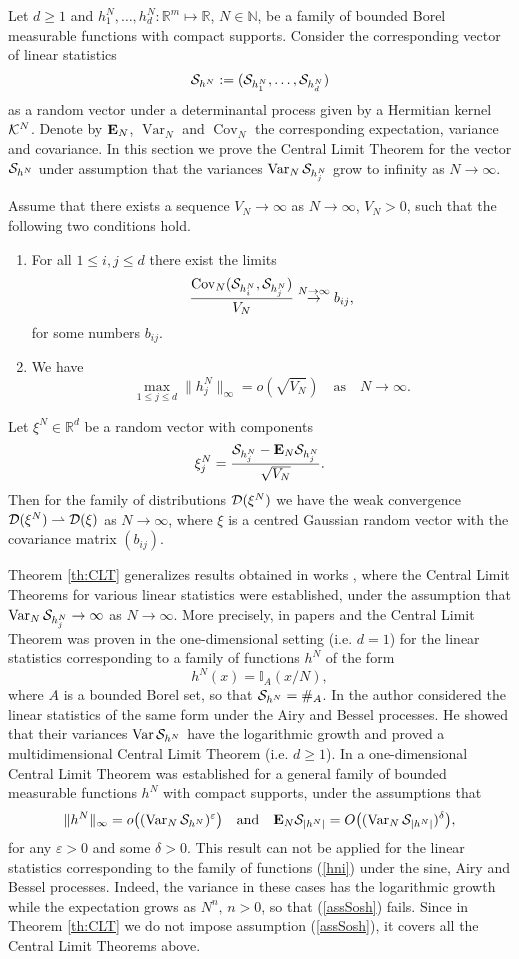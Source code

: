 \documentclass{article}
\numberwithin{equation}{section}
\newcommand{\mR}{\mathbb{R}}
\newcommand{\mN}{\mathbb{N}}
\newcommand{\mI}{\mathbb{I}}
\newcommand{\DD}{{\cal D}}
\newcommand{\SSS}{{\cal S}}
\newcommand{\KK}{{\cal K}}
\newcommand{\eps}{\varepsilon}
\newcommand{\Cov}{\operatorname{Cov}}
\newcommand{\Var}{\operatorname{Var}}
\newcommand{\MON}{\mbox{\bf E}_N}
\newcommand{\ra}{\rightarrow}
\newcommand{\raw}{\rightharpoonup}
\newcommand{\os}{\overset}
\newcommand{\fr}{\frac}
\newcommand{\qmb}{\quad\mbox}
\newcommand{\qu}{\quad}
\newcommand{\lbl}{\label}
\newcommand{\ass}{\quad\mbox{as}\quad}
\newcommand{\bee}{\begin{equation}}
\newcommand{\eee}{\end{equation}}
\newcommand{\btt}{\begin{theo}}
\newcommand{\ett}{\end{theo}}
\begin{document}
Let $d\geq 1$ and $h_1^N,\ldots, h^N_d:\mR^m\mapsto\mR$, $N\in\mN$,
be a family of bounded Borel measurable functions with compact supports.
Consider the corresponding vector of linear statistics
$$
\SSS_{h^N}:=(\SSS_{h^N_1},\ldots,\SSS_{h^N_d})
$$
as a random vector under a determinantal process given by a Hermitian kernel $\KK^N$.
Denote by $\MON$, $\Var_N$ and $\Cov_N$ the corresponding expectation, variance and covariance.
In this section we prove the Central Limit Theorem
for the vector $\SSS_{h^N}$
under assumption that the variances $\Var_N\SSS_{h^N_j}$ grow to infinity as $N\ra\infty$.
\btt\label{th:CLT}
Assume that there exists a sequence $V_N\ra\infty$ as $N\ra\infty$, $V_N >0$,
such that the following
two conditions hold.
\begin{enumerate}
  \item For all $1\leq i,j\leq d$ there exist the limits
\bee\lbl{thcov}
\fr{\Cov_N (\SSS_{h^N_i},\SSS_{h^N_j})}{V_N}\os{N\ra\infty}\ra b_{ij} ,
\eee
for some numbers $b_{ij}$.
\item We have
\bee
\lbl{th|h|}
\max\limits_{1\leq j\leq d} \|h^N_j\|_\infty = o(\sqrt{V_N}) \ass N\ra\infty.
\eee
\end{enumerate}
Let $\xi^N\in\mR^d$ be a random vector with components
\bee\lbl{gxi}
\xi^N_j=\fr{\SSS_{h^N_j}-\MON\SSS_{h^N_j}}{\sqrt{V_N}}.
\eee
Then for the family of distributions $\DD(\xi^N)$ we have the weak convergence $\DD(\xi^N)\raw \DD(\xi)$ as $N\ra\infty$, where $\xi$ is a
centred Gaussian random vector with the covariance matrix $(b_{ij}).$
\ett
Theorem \ref{th:CLT}  generalizes results obtained in works \cite{CL,So00,SoAB,So01},
where the Central Limit Theorems for various linear statistics were established,
under the assumption that $\Var_N\SSS_{h^N_j}\ra\infty$ as $N\ra\infty$.
More precisely, in papers \cite{CL} and \cite{So00}
the Central Limit Theorem was proven in the one-dimensional setting (i.e. $d=1$)
for the linear statistics
corresponding to a family of functions $h^N$ of the form
\bee\lbl{hni}
h^N(x)=\mI_{A}(x/N),
\eee
where $A$ is a bounded Borel set, so that $\SSS_{h^N}=\#_A$.
In \cite{SoAB} the author considered the linear statistics of the same form
under the Airy and Bessel processes.
He showed that their variances $\Var\SSS_{h^N}$
have the logarithmic growth
and proved a multidimensional Central Limit Theorem (i.e. $d\geq 1$).
In \cite{So01} a one-dimensional Central Limit Theorem was established
for a general family of
bounded measurable functions $h^N$ with compact supports,
under the assumptions that
\bee\lbl{assSosh}
\|h^N\|_\infty = o\big((\Var_N \SSS_{h^N})^\eps\big)
\qmb{and} \qu \MON\SSS_{|h^N|}=O\big((\Var_N \SSS_{|h^N|})^\delta\big),
\eee
for any $\eps>0$ and some $\delta>0$.
This result can not be applied
for the linear statistics corresponding to the family of functions (\ref{hni})
under the sine, Airy and Bessel processes.
Indeed, the variance in these cases has the logarithmic growth
while the expectation grows as $N^n,\, n>0$,
so that (\ref{assSosh}) fails.
Since in Theorem \ref{th:CLT} we do not impose assumption (\ref{assSosh}),
it covers all the Central Limit Theorems above.
\end{document}

